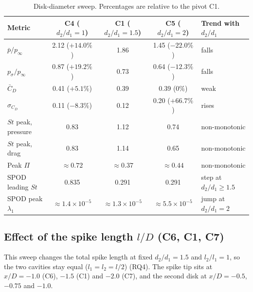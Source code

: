 \documentclass[11pt,a4paper]{article}
\newcommand{\pbar}{\bar{p}/p_\infty}
\newcommand{\psd}{p_\sigma/p_\infty}
\newcommand{\Cdm}{\bar{C}_D}
\newcommand{\sCd}{\sigma_{C_D}}
\newcommand{\ltl}{l_2/l_1}
\newcommand{\dtd}{d_2/d_1}
\begin{document}
\begin{table}[htbp]
  \centering
  \caption{Disk-diameter sweep. Percentages are relative to the pivot C1.}
  \label{tab:dia}
  \begin{tabular}{lcccl}
    \toprule
    Metric & C4 ($\dtd = 1$) & C1 ($\dtd = 1.5$) & C5 ($\dtd = 2$) & Trend with $\dtd$ \\
    \midrule
    $\pbar$ & 2.12 ($+14.0\%$) & 1.86 & 1.45 ($-22.0\%$) & falls \\
    $\psd$ & 0.87 ($+19.2\%$) & 0.73 & 0.64 ($-12.3\%$) & falls \\
    $\Cdm$ & 0.41 ($+5.1\%$) & 0.39 & 0.39 (0\%) & weak \\
    $\sCd$ & 0.11 ($-8.3\%$) & 0.12 & 0.20 ($+66.7\%$) & rises \\
    $St$ peak, pressure & 0.83 & 1.12 & 0.74 & non-monotonic \\
    $St$ peak, drag & 0.83 & 1.14 & 0.65 & non-monotonic \\
    Peak $\Pi$ & $\approx 0.72$ & $\approx 0.37$ & $\approx 0.44$ & non-monotonic \\
    SPOD leading $St$ & 0.835 & 0.291 & 0.291 & step at $\dtd \ge 1.5$ \\
    SPOD peak $\lambda_1$ & $\approx 1.4\times10^{-5}$ & $\approx 1.3\times10^{-5}$ & $\approx 5.5\times10^{-5}$ & jump at $\dtd = 2$ \\
    \bottomrule
  \end{tabular}
\end{table}

\subsection{Effect of the spike length $l/D$ (C6, C1, C7)}\label{sec:len}

This sweep changes the total spike length at fixed $\dtd = 1.5$ and $\ltl = 1$, so the two cavities stay equal ($l_1 = l_2 = l/2$) (RQ4). The spike tip sits at $x/D = -1.0$ (C6), $-1.5$ (C1) and $-2.0$ (C7), and the second disk at $x/D = -0.5$, $-0.75$ and $-1.0$.
\end{document}
